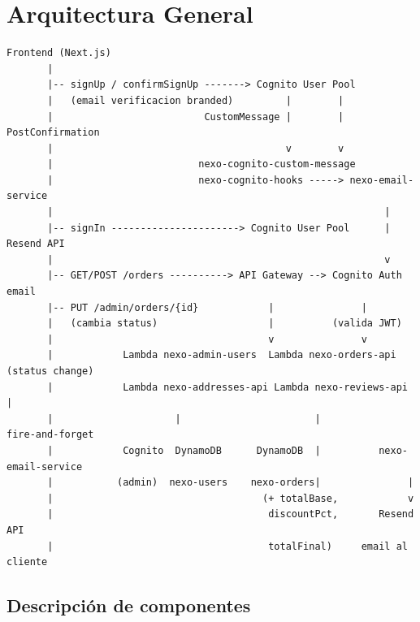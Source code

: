 \documentclass[12pt,a4paper]{article}
\begin{document}
\section{Arquitectura General}

\begin{lstlisting}[caption={Arquitectura general del backend}, numbers=none]
  Frontend (Next.js)
       |
       |-- signUp / confirmSignUp -------> Cognito User Pool
       |   (email verificacion branded)         |        |
       |                          CustomMessage |        | PostConfirmation
       |                                        v        v
       |                         nexo-cognito-custom-message
       |                         nexo-cognito-hooks -----> nexo-email-service
       |                                                         |
       |-- signIn ----------------------> Cognito User Pool      | Resend API
       |                                                         v
       |-- GET/POST /orders ----------> API Gateway --> Cognito Auth   email
       |-- PUT /admin/orders/{id}            |               |
       |   (cambia status)                   |          (valida JWT)
       |                                     v               v
       |            Lambda nexo-admin-users  Lambda nexo-orders-api (status change)
       |            Lambda nexo-addresses-api Lambda nexo-reviews-api      |
       |                     |                       |               fire-and-forget
       |            Cognito  DynamoDB      DynamoDB  |          nexo-email-service
       |           (admin)  nexo-users    nexo-orders|               |
       |                                    (+ totalBase,            v
       |                                     discountPct,       Resend API
       |                                     totalFinal)     email al cliente
\end{lstlisting}

\subsection*{Descripción de componentes}
\end{document}
